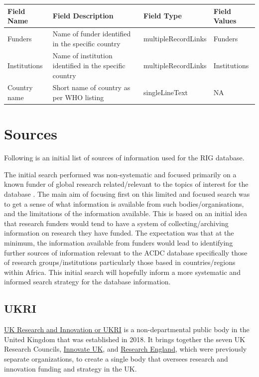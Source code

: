 \documentclass[
]{book}
\begin{document}
\begin{table}
\centering
\begin{tabular}{l|l|l|l}
\hline
\textbf{Field Name} & \textbf{Field Description} & \textbf{Field Type} & \textbf{Field Values}\\
\hline
Funders & Name of funder identified in the specific country & multipleRecordLinks & Funders\\
\hline
Institutions & Name of institution identified in the specific country & multipleRecordLinks & Institutions\\
\hline
Country name & Short name of country as per WHO listing & singleLineText & NA\\
\hline
\end{tabular}
\end{table}

\hypertarget{sources}{%
\chapter{Sources}\label{sources}}

Following is an initial list of sources of information used for the RIG database.

The initial search performed was non-systematic and focused primarily on a known funder of global research related/relevant to the topics of interest for the database . The main aim of focusing first on this limited and focused search was to get a sense of what information is available from such bodies/organisations, and the limitations of the information available. This is based on an initial idea that research funders would tend to have a system of collecting/archiving information on research they have funded. The expectation was that at the minimum, the information available from funders would lead to identifying further sources of information relevant to the ACDC database specifically those of research groups/institutions particularly those based in countries/regions within Africa. This initial search will hopefully inform a more systematic and informed search strategy for the database information.

\hypertarget{ukri}{%
\section{UKRI}\label{ukri}}

\href{https://www.ukri.org/}{UK Research and Innovation or UKRI} is a non-departmental public body in the United Kingdom that was established in 2018. It brings together the seven UK Research Councils, \href{https://www.ukri.org/councils/innovate-uk/}{Innovate UK}, and \href{https://www.ukri.org/councils/research-england/}{Research England}, which were previously separate organizations, to create a single body that oversees research and innovation funding and strategy in the UK.
\end{document}
